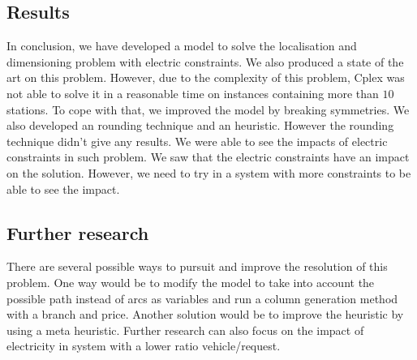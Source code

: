 \begin{bibunit}[ieeetr]
\subsection{Results}
In conclusion, we have developed a model to solve the localisation and dimensioning problem with electric constraints.
We also produced a state of the art on this problem.
However, due to the complexity of this problem, Cplex was not able to solve it in a reasonable time on instances containing more than $10$ stations.
To cope with that, we improved the model by breaking symmetries.
We also developed an rounding technique and an heuristic.
However the rounding technique didn't give any results.
We were able to see the impacts of electric constraints in such problem. We saw that the electric constraints have an impact on the solution.
However, we need to try in a system with more constraints to be able to see the impact.

\subsection{Further research}
There are several possible ways to pursuit and improve the resolution of this problem.
One way would be to modify the model to take into account the possible path instead of arcs as variables and run a column generation method with a branch and price.
Another solution would be to improve the heuristic by using a meta heuristic.
Further research can also focus on the impact of electricity in system with a lower ratio vehicle/request.

\newpage
{}
\renewcommand{\bibname}{Bibliography of chapter \thechapter}
\end{bibunit}
